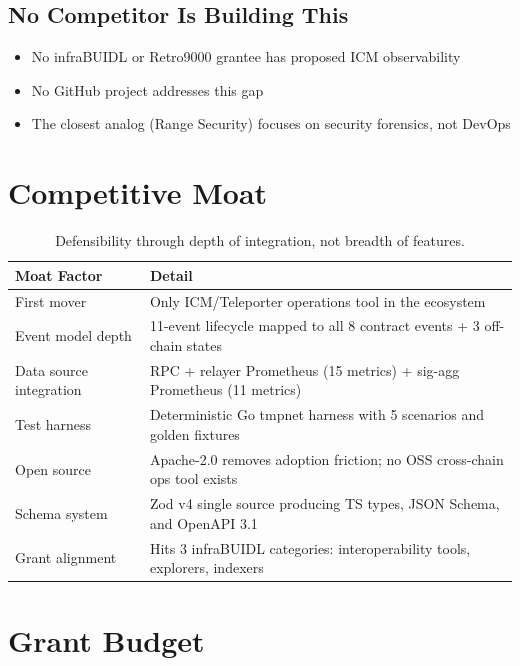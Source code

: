 \documentclass[11pt,a4paper]{article}
\begin{document}
\subsection{No Competitor Is Building This}

\begin{itemize}
  \item No infraBUIDL or Retro9000 grantee has proposed ICM observability
  \item No GitHub project addresses this gap
  \item The closest analog (Range Security) focuses on security forensics, not DevOps
\end{itemize}

\section{Competitive Moat}

\begin{table}[h]
\centering
\small
\begin{tabularx}{\textwidth}{@{}l L{10cm}@{}}
\toprule
\textbf{Moat Factor} & \textbf{Detail} \\
\midrule
First mover & Only ICM/Teleporter operations tool in the ecosystem \\
Event model depth & 11-event lifecycle mapped to all 8 contract events + 3 off-chain states \\
Data source integration & RPC + relayer Prometheus (15 metrics) + sig-agg Prometheus (11 metrics) \\
Test harness & Deterministic Go tmpnet harness with 5 scenarios and golden fixtures \\
Open source & Apache-2.0 removes adoption friction; no OSS cross-chain ops tool exists \\
Schema system & Zod v4 single source producing TS types, JSON Schema, and OpenAPI 3.1 \\
Grant alignment & Hits 3 infraBUIDL categories: interoperability tools, explorers, indexers \\
\bottomrule
\end{tabularx}
\caption{Defensibility through depth of integration, not breadth of features.}
\end{table}

\section{Grant Budget}
\end{document}
